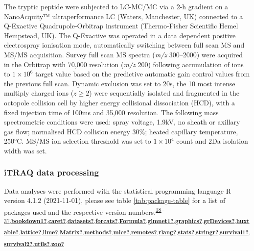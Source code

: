 \documentclass[
]{article}
\begin{document}
The tryptic peptide were subjected to LC-MC/MC via a 2-h gradient on a NanoAcquity™ ultraperformance LC (Waters, Manchester, UK) connected to a Q-Exactive Quadrupole-Orbitrap instrument (Thermo-Fisher Scientific Hemel Hempstead, UK).
The Q-Exactive was operated in a data dependent positive electrospray ionisation mode, automatically switching between full scan MS and MS/MS acquisition.
Survey full scan MS spectra (\emph{m/z} 300--2000) were acquired in the Orbitrap with 70,000 resolution (\emph{m/z} 200) following accumulation of ions to \(1\times 10^6\) target value based on the predictive automatic gain control values from the previous full scan.
Dynamic exclusion was set to 20s, the 10 most intense multiply charged ions (\(z \geq 2\)) were sequentially isolated and fragmented in the octopole collision cell by higher energy collisional dissociation (HCD), with a fixed injection time of 100ms and 35,000 resolution.
The following mass spectrometric conditions were used: spray voltage, 1.9kV, no sheath or axillary gas flow; normalised HCD collision energy 30\%; heated capillary temperature, 250°C.
MS/MS ion selection threshold was set to \(1\times 10^4\) count and 2Da isolation width was set.

\hypertarget{itraq-stats}{%
\subsubsection{iTRAQ data processing}\label{itraq-stats}}

Data analyses were performed with the statistical programming language R version 4.1.2 (2021-11-01), please see table \ref{tab:package-table} for a list of packages used and the respective version numbers.\textsuperscript{\protect\hyperlink{ref-base}{18}--\protect\hyperlink{ref-tidyverse}{37},\protect\hyperlink{ref-bookdown1}{\textbf{bookdown1?}},\protect\hyperlink{ref-caret}{\textbf{caret?}},\protect\hyperlink{ref-datasets}{\textbf{datasets?}},\protect\hyperlink{ref-forcats}{\textbf{forcats?}},\protect\hyperlink{ref-Formula}{\textbf{Formula?}},\protect\hyperlink{ref-glmnet1}{\textbf{glmnet1?}},\protect\hyperlink{ref-graphics}{\textbf{graphics?}},\protect\hyperlink{ref-grDevices}{\textbf{grDevices?}},\protect\hyperlink{ref-huxtable}{\textbf{huxtable?}},\protect\hyperlink{ref-lattice}{\textbf{lattice?}},\protect\hyperlink{ref-lime}{\textbf{lime?}},\protect\hyperlink{ref-Matrix}{\textbf{Matrix?}},\protect\hyperlink{ref-methods}{\textbf{methods?}},\protect\hyperlink{ref-mice}{\textbf{mice?}},\protect\hyperlink{ref-remotes}{\textbf{remotes?}},\protect\hyperlink{ref-rlang}{\textbf{rlang?}},\protect\hyperlink{ref-stats}{\textbf{stats?}},\protect\hyperlink{ref-stringr}{\textbf{stringr?}},\protect\hyperlink{ref-survival1}{\textbf{survival1?}},\protect\hyperlink{ref-survival2}{\textbf{survival2?}},\protect\hyperlink{ref-utils}{\textbf{utils?}},\protect\hyperlink{ref-zoo}{\textbf{zoo?}}}
\end{document}
